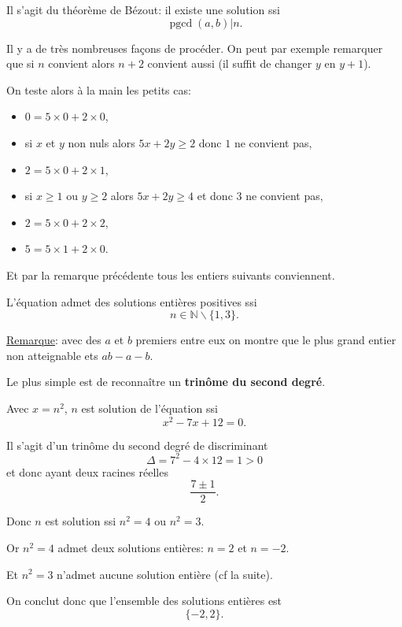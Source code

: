 \begin{sol}
  Il s'agit du théorème de Bézout: il existe une solution ssi
  \[\boxed{\operatorname{pgcd}(a,b) | n}.\]
\end{sol}

\begin{sol}
  Il y a de très nombreuses façons de procéder. On peut par exemple remarquer que si $n$ convient alors $n+2$ convient aussi (il suffit de changer $y$ en $y+1$).

  On teste alors à la main les petits cas:
  \begin{itemize}
    \item $0=5 \times 0 + 2 \times 0$,
    \item si $x$ et $y$ non nuls alors $5x+2y \geq 2$ donc $1$ ne convient pas,
    \item $2=5 \times 0 + 2 \times 1$,
    \item si $x\geq 1$ ou $y\geq 2$ alors $5x+2y \geq 4$ et donc $3$ ne convient pas,
    \item $2=5 \times 0 + 2 \times 2$,
    \item $5=5 \times 1 + 2 \times 0$.
  \end{itemize}

  Et par la remarque précédente tous les entiers suivants conviennent.

  L'équation admet des solutions entières positives ssi
  \[\boxed{n \in \mathbb{N} \backslash \{1,3\}}.\]

  \underline{Remarque}: avec des $a$ et $b$ premiers entre eux on montre que le plus grand entier non atteignable ets $ab-a-b$.
\end{sol}


\begin{sol}
  Le plus simple est de reconnaître un \textbf{trinôme du second degré}.

  Avec $x = n^2$, $n$ est solution de l'équation ssi
  \[x^2-7x+12 = 0.\]

  Il s'agit d'un trinôme du second degré de discriminant
  \[\Delta = 7^2 - 4 \times 12 = 1 > 0\]
  et donc ayant deux racines réelles
  \[\frac{7 \pm 1}{2}.\]

  Donc $n$ est solution ssi $n^2 = 4$ ou $n^2 = 3$.

  Or $n^2 = 4$ admet deux solutions entières: $n=2$ et $n=-2$.

  Et $n^2 = 3$ n'admet aucune solution entière (cf la suite).


  On conclut donc que l'ensemble des solutions entières est
  \[\boxed{\{-2,2\}}.\]
\end{sol}

